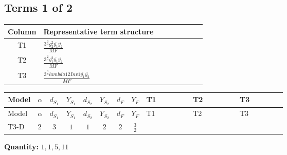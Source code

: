 \documentclass[8pt]{article}
\begin{document}
\begin{landscape}
\subsection*{Terms 1 of 2}
\begin{center}
\begin{tabular}{@{}c >{\raggedright\arraybackslash}p{0.82\linewidth}@{}}
\toprule
Column & Representative term structure \\
\midrule
T1 & \(\displaystyle \frac{3^{\frac{3}{4}} g_{2}^{2} \overline{y_{1}} \overline{y_{2}}}{MF}\) \\
\midrule
T2 & \(\displaystyle \frac{3^{\frac{3}{4}} g_{1}^{2} \overline{y_{1}} \overline{y_{2}}}{MF}\) \\
\midrule
T3 & \(\displaystyle \frac{3^{\frac{3}{4}} lambda12Inv1 \overline{y_{1}} \overline{y_{2}}}{MF}\) \\
\midrule
\bottomrule
\end{tabular}
\end{center}
\smallskip
\tiny
\begin{longtable}{@{}llcccccc >{\raggedright\arraybackslash}p{0.21\linewidth} >{\raggedright\arraybackslash}p{0.21\linewidth} >{\raggedright\arraybackslash}p{0.21\linewidth}@{}}
\toprule
Model & $\alpha$ & $d_{S_1}$ & $Y_{S_1}$ & $d_{S_2}$ & $Y_{S_2}$ & $d_F$ & $Y_F$ & T1 & T2 & T3 \\
\midrule
\endfirsthead
\toprule
Model & $\alpha$ & $d_{S_1}$ & $Y_{S_1}$ & $d_{S_2}$ & $Y_{S_2}$ & $d_F$ & $Y_F$ & T1 & T2 & T3 \\
\midrule
\endhead
T3-D & $2$ & $3$ & $1$ & $1$ & $2$ & $2$ & $\frac{3}{2}$ & \scriptsize\adjustbox{max width=\linewidth}{$\begin{gathered} - \frac{17 \cdot 3^{\frac{3}{4}} g_{2}^{2} \overline{y_{1}} \overline{y_{2}}}{24 MF}\end{gathered}$} & \scriptsize\adjustbox{max width=\linewidth}{$\begin{gathered} - \frac{9 \cdot 3^{\frac{3}{4}} g_{1}^{2} \overline{y_{1}} \overline{y_{2}}}{8 MF}\end{gathered}$} & \scriptsize\adjustbox{max width=\linewidth}{$\begin{gathered} - \frac{3^{\frac{3}{4}} lambda12Inv1 \overline{y_{1}} \overline{y_{2}}}{6 MF}\end{gathered}$} \\
\midrule
\bottomrule
\end{longtable}
\clearpage
\noindent\textbf{Quantity: }$\mathrm{1,1,5,11}$\par\smallskip

\end{landscape}
\end{document}
